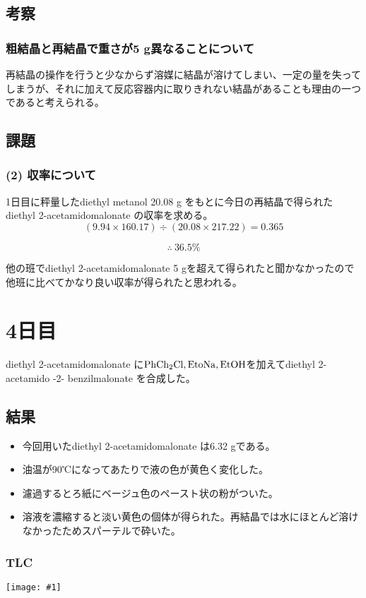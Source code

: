 \documentclass[a4paper,papersize,dvipdfmx]{jsarticle}
\newcommand{\pict}[2]{\begin{center} \texttt{[image: \#1]} \end{center}}   %
\begin{document}
\subsection*{考察}
\subsubsection*{粗結晶と再結晶で重さが5 g異なることについて}
再結晶の操作を行うと少なからず溶媒に結晶が溶けてしまい、一定の量を失ってしまうが、それに加えて反応容器内に取りきれない結晶があることも理由の一つであると考えられる。

\subsection*{課題}
\subsubsection*{(2) 収率について}
1日目に秤量したdiethyl metanol 20.08 g をもとに今日の再結晶で得られたdiethyl 2-acetamidomalonate の収率を求める。
\[(9.94 \times 160.17) \div (20.08 \times 217.22) = 0.365\]

\[\therefore
\ 36.5 \%\]

他の班でdiethyl 2-acetamidomalonate 5 gを超えて得られたと聞かなかったので他班に比べてかなり良い収率が得られたと思われる。

\section*{4日目}
diethyl 2-acetamidomalonate に$\rm PhCh_2Cl, EtoNa, EtOH$を加えてdiethyl 2-acetamido -2- benzilmalonate を合成した。

\subsection*{結果}
\begin{itemize}
\item 今回用いたdiethyl 2-acetamidomalonate は6.32 gである。
\item 油温が90℃になってあたりで液の色が黄色く変化した。
\item 濾過するとろ紙にベージュ色のペースト状の粉がついた。
\item 溶液を濃縮すると淡い黄色の個体が得られた。再結晶では水にほとんど溶けなかったためスパーテルで砕いた。

\end{itemize}
\subsubsection*{TLC}
\pict{imgs4/tlc.jpeg}{7}
\end{document}
